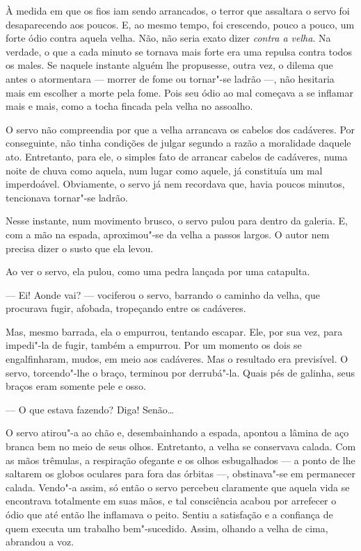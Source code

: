 À medida em que os fios iam sendo arrancados, o terror que assaltara o
servo foi desaparecendo aos poucos. E, ao mesmo tempo, foi crescendo,
pouco a pouco, um forte ódio contra aquela velha. Não, não seria exato
dizer \textit{contra a velha}. Na verdade, o que a cada minuto se tornava mais
forte era uma repulsa contra todos os males. Se naquele instante alguém
lhe propusesse, outra vez, o dilema que antes o atormentara --- morrer de
fome ou tornar"-se ladrão ---, não hesitaria mais em escolher a morte pela
fome. Pois seu ódio ao mal começava a se inflamar mais e mais, como a
tocha fincada pela velha no assoalho.

O servo não compreendia por que a velha arrancava os cabelos dos
cadáveres. Por conseguinte, não tinha condições de julgar segundo a
razão a moralidade daquele ato. Entretanto, para ele, o simples fato de
arrancar cabelos de cadáveres, numa noite de chuva como aquela, num
lugar como aquele, já constituía um mal imperdoável. Obviamente, o
servo já nem recordava que, havia poucos minutos, tencionava tornar"-se
ladrão.

Nesse instante, num movimento brusco, o servo pulou para dentro da
galeria. E, com a mão na espada, aproximou"-se da velha a passos largos.
O autor nem precisa dizer o susto que ela levou.

Ao ver o servo, ela pulou, como uma pedra lançada por uma catapulta.

--- Ei! Aonde vai? --- vociferou o servo, barrando o caminho da velha, que
procurava fugir, afobada, tropeçando entre os cadáveres.

Mas, mesmo barrada, ela o empurrou, tentando escapar. Ele, por sua vez,
para impedi"-la de fugir, também a empurrou. Por um momento os dois se
engalfinharam, mudos, em meio aos cadáveres. Mas o resultado era
previsível. O servo, torcendo"-lhe o braço, terminou por derrubá"-la.
Quais pés de galinha, seus braços eram somente pele e osso.

--- O que estava fazendo? Diga! Senão\ldots{}

O servo atirou"-a ao chão e, desembainhando a espada, apontou a lâmina de
aço branca bem no meio de seus olhos. Entretanto, a velha se conservava
calada. Com as mãos trêmulas, a respiração ofegante e os olhos
esbugalhados --- a ponto de lhe saltarem os globos oculares para fora das
órbitas ---, obstinava"-se em permanecer calada. Vendo"-a assim, só então o
servo percebeu claramente que aquela vida se encontrava totalmente em
suas mãos, e tal consciência acabou por arrefecer o ódio que até então
lhe inflamava o peito. Sentiu a satisfação e a confiança de quem
executa um trabalho bem"-sucedido. Assim, olhando a velha de cima,
abrandou a voz.

